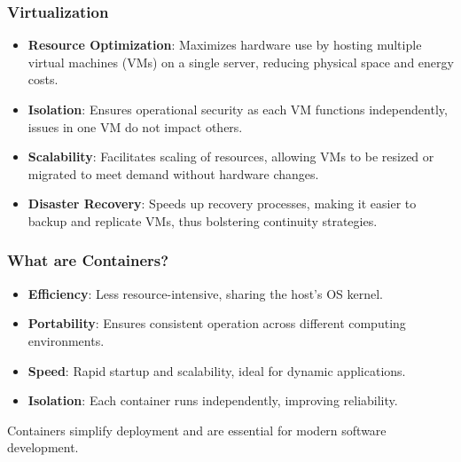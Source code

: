 \documentclass{beamer}
\begin{document}
\begin{frame}
    \frametitle{Virtualization}
    \vspace{10pt}

    \begin{itemize}
        \item\textbf{Resource Optimization}: Maximizes hardware use by hosting multiple virtual machines (VMs) on a single server, reducing physical space and energy costs.
        \item\textbf{Isolation}: Ensures operational security as each VM functions independently, issues in one VM do not impact others.
        \item\textbf{Scalability}: Facilitates scaling of resources, allowing VMs to be resized or migrated to meet demand without hardware changes.
        \item\textbf{Disaster Recovery}: Speeds up recovery processes, making it easier to backup and replicate VMs, thus bolstering continuity strategies.
    \end{itemize}
\end{frame}

\begin{frame}
    \frametitle{What are Containers?}
    \vspace{10pt}
    \begin{itemize}
        \item\textbf{Efficiency}: Less resource{-}intensive, sharing the host's OS kernel.
        \item\textbf{Portability}: Ensures consistent operation across different computing environments.
        \item\textbf{Speed}: Rapid startup and scalability, ideal for dynamic applications.
        \item\textbf{Isolation}: Each container runs independently, improving reliability.
    \end{itemize}
    \vspace{10pt}
    Containers simplify deployment and are essential for modern software development.
\end{frame}
\end{document}
